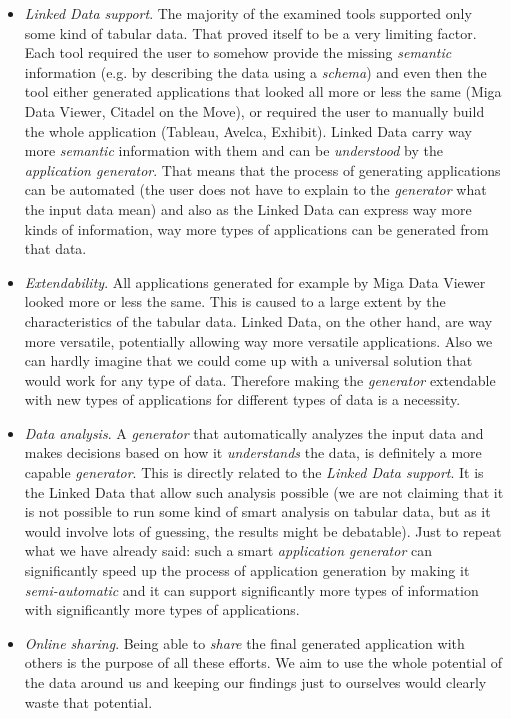 \begin{itemize}
\item \emph{Linked Data support}. The majority of the examined tools supported only some kind of tabular data. That proved itself to be a very limiting factor. Each tool required the user to somehow provide the missing \emph{semantic} information (e.g. by describing the data using a \emph{schema}) and even then the tool either generated applications that looked all more or less the same (Miga Data Viewer, Citadel on the Move), or required the user to manually build the whole application (Tableau, Avelca, Exhibit). Linked Data carry way more \emph{semantic} information with them and can be \emph{understood} by the \emph{application generator}. That means that the process of generating applications can be automated (the user does not have to explain to the \emph{generator} what the input data mean) and also as the Linked Data can express way more kinds of information, way more types of applications can be generated from that data.
\item \emph{Extendability}. All applications generated for example by Miga Data Viewer looked more or less the same.  This is caused to a large extent by the characteristics of the tabular data. Linked Data, on the other hand, are way more versatile, potentially allowing way more versatile applications. Also we can hardly imagine that we could come up with a universal solution that would work for any type of data. Therefore making the \emph{generator} extendable with new types of applications for different types of data is a necessity.
\item \emph{Data analysis}. A \emph{generator} that automatically analyzes the input data and makes decisions based on how it \emph{understands} the data, is definitely a more capable \emph{generator}. This is directly related to the \emph{Linked Data support}. It is the Linked Data that allow such analysis possible (we are not claiming that it is not possible to run some kind of smart analysis on tabular data, but as it would involve lots of guessing, the results might be debatable). Just to repeat what we have already said: such a smart \emph{application generator} can significantly speed up the process of application generation by making it \emph{semi-automatic} and it can support significantly more types of information with significantly more types of applications.
\item \emph{Online sharing}. Being able to \emph{share} the final generated application with others is the purpose of all these efforts. We aim to use the whole potential of the data around us and keeping our findings just to ourselves would clearly waste that potential.

\end{itemize}
